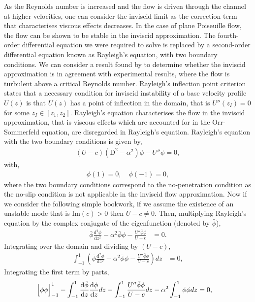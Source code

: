 \documentclass[a4paper, 12pt, twoside, openright]{article}
\numberwithin{equation}{section}
\begin{document}
As the Reynolds number is increased and the flow is driven through the channel at higher velocities, one can consider the inviscid limit as the correction term that characterises viscous effects decreases. In the case of plane Poiseuille flow, the flow can be shown to be stable in the inviscid approximation. The fourth-order differential equation we were required to solve is replaced by a second-order differential equation known as Rayleigh's equation, with two boundary conditions. We can consider a result found by \cite{Rayleigh1880} to determine whether the inviscid approximation is in agreement with experimental results, where the flow is turbulent above a critical Reynolds number. Rayleigh's inflection point criterion states that a necessary condition for inviscid instability of a base velocity profile $U(z)$ is that $U(z)$ has a point of inflection in the domain, that is $U''(z_{I})=0$ for some $z_I\in[z_1,z_2]$. Rayleigh's equation characterises the flow in the inviscid approximation, that is viscous effects which are accounted for in the Orr-Sommerfeld equation, are disregarded in Rayleigh's equation. Rayleigh's equation with the two boundary conditions is given by,
\begin{align}
\left(U-c\right)\left(\mathrm{D}^2-\alpha^2\right)\phi - U''\phi = 0, 
\end{align}
with,
\begin{align}
\phi(1) = 0, \quad \phi(-1) = 0,
\end{align}
where the two boundary conditions correspond to the no-penetration condition as the no-slip condition is not applicable in the inviscid flow approximation. Now if we consider the following simple bookwork, if we assume the existence of an unstable mode that is $\mathrm{Im}(c)>0$ then $U-c\neq 0$. Then, multiplying Rayleigh's equation by the complex conjugate of the eigenfunction (denoted by $\bar\phi$),
\begin{align}
\bar\phi\frac{\mathrm{d}^2\phi}{\mathrm{d}z^2}-\alpha^2\bar\phi\phi - \frac{U''\bar\phi\phi}{U-c} &= 0.
\end{align} 
Integrating over the domain and dividing by $(U-c)$,
\begin{align}
\int_{-1}^{1}\left(\bar\phi\frac{\mathrm{d}^2\phi}{\mathrm{d}z^2}-\alpha^2\bar\phi\phi - \frac{U''\bar\phi\phi}{U-c} \right)dz &= 0, \nonumber
\end{align}
Integrating the first term by parts,
\begin{align}
\Bigl[\bar\phi\phi\Bigr]_{-1}^1 - \int_{-1}^{1}\frac{\mathrm{d}\bar\phi}{\mathrm{d}z}\frac{\mathrm{d}\phi}{\mathrm{d}z} dz - \int_{-1}^{1}\frac{U''\bar\phi\phi}{U-c} dz - \alpha^2\int_{-1}^{1}\bar\phi\phi dz &= 0, 
\end{align}
\end{document}

